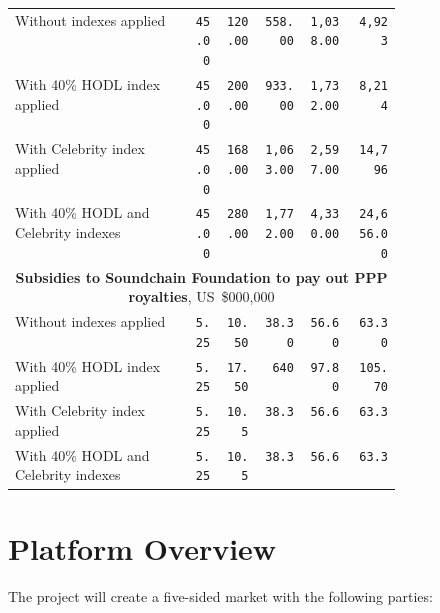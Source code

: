 \documentclass[12pt]{report}
\begin{document}
\begin{table}[H]
\begin{tabular}{p{0.45\linewidth}rrrrr}
Without indexes applied & 
\texttt{45.00} & \texttt{120.00} & \texttt{558.00} & \texttt{1,038.00} & \texttt{4,923} \\
With 40\% HODL index applied & 
\texttt{45.00} & \texttt{200.00} & \texttt{933.00} & \texttt{1,732.00} & \texttt{8,214} \\
With Celebrity index applied & 
\texttt{45.00} & \texttt{168.00} & \texttt{1,063.00} & \texttt{2,597.00} & \texttt{14,796} \\
With 40\% HODL and Celebrity indexes & 
\texttt{45.00} & \texttt{280.00} & \texttt{1,772.00} & \texttt{4,330.00} & \texttt{24,656.00} \\

\midrule
\multicolumn{6}{c}{\textbf{Subsidies to Soundchain Foundation to pay out PPP royalties}, US~\$000,000} \\
\midrule

Without indexes applied & 
\texttt{5.25} & \texttt{10.50} & \texttt{38.30} & \texttt{56.60} & \texttt{63.30} \\
With 40\% HODL index applied & 
\texttt{5.25} & \texttt{17.50} & \texttt{640} & \texttt{97.80} & \texttt{105.70} \\
With Celebrity index applied & 
\texttt{5.25} & \texttt{10.5} & \texttt{38.3} & \texttt{56.6} & \texttt{63.3} \\
With 40\% HODL and Celebrity indexes & 
\texttt{5.25} & \texttt{10.5} & \texttt{38.3} & \texttt{56.6} & \texttt{63.3} \\

\end{tabular}
\end{table}

\chapter{Platform Overview}
\label{platform}

The project will create a five-sided market with the following parties:
 
\end{document}
